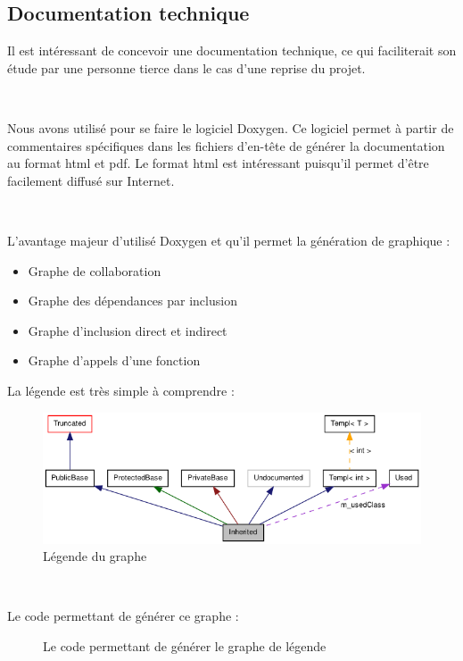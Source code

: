 \documentclass[frenchb,twoside]{EPURapport}
\begin{document}
		
		\subsection{Documentation technique}
		
		Il est intéressant de concevoir une documentation technique, ce qui faciliterait
		son étude par une personne tierce dans le cas d'une reprise du projet.
		
		\
		
		Nous avons utilisé pour se faire le logiciel Doxygen.
		Ce logiciel permet à partir de commentaires spécifiques dans les fichiers d'en-tête
		de générer la documentation au format html et pdf.
		Le format html est intéressant puisqu'il permet d'être facilement diffusé sur Internet.
		
		\
		
		L'avantage majeur d'utilisé Doxygen et qu'il permet la génération de graphique :
		\begin{itemize}
			\item Graphe de collaboration
			\item Graphe des dépendances par inclusion
			\item Graphe d'inclusion direct et indirect
			\item Graphe d'appels d'une fonction
		\end{itemize}
		

\newpage
		
		La légende est très simple à comprendre :
		\begin{figure}[h]
			\centering
			\includegraphics[width=12cm]{images/graph_legend.png}
			\caption{\label{fig:graph_legend}Légende du graphe}
		\end{figure}
		
		\
		
		Le code permettant de générer ce graphe :
		\begin{figure}[h]
			\centering
			\caption{\label{fig:graph_legend_code}Le code permettant de générer le graphe de légende}
		\end{figure}
		
\end{document}
